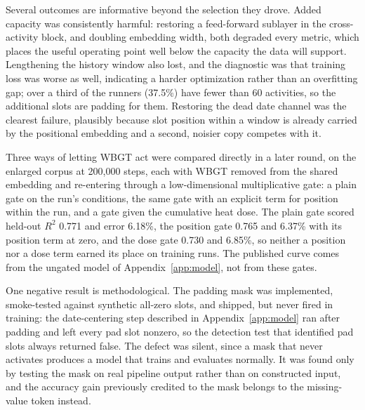 Several outcomes are informative beyond the selection they drove. Added capacity was consistently
harmful: restoring a feed-forward sublayer in the cross-activity block, and doubling embedding width,
both degraded every metric, which places the useful operating point well below the capacity the data
will support. Lengthening the history window also lost, and the diagnostic was that training loss was
worse as well, indicating a harder optimization rather than an overfitting gap; over a third of the
runners (37.5\%) have fewer than 60 activities, so the additional slots are padding for them. Restoring the
dead date channel was the clearest failure, plausibly because slot position within a window is
already carried by the positional embedding and a second, noisier copy competes with it.

Three ways of letting WBGT act were compared directly in a later round, on the enlarged corpus at 200{,}000 steps,
each with WBGT removed from the shared embedding and re-entering through a low-dimensional multiplicative gate: a plain
gate on the run's conditions, the same gate with an explicit term for position within the run, and a gate given the
cumulative heat dose. The plain gate scored held-out $R^2$ 0.771 and error 6.18\%, the position gate 0.765 and 6.37\%
with its position term at zero, and the dose gate 0.730 and 6.85\%, so neither a position nor a dose term earned its
place on training runs. The published curve comes from the ungated model of Appendix~\ref{app:model}, not from these
gates.

One negative result is methodological. The padding mask was implemented, smoke-tested against
synthetic all-zero slots, and shipped, but never fired in training: the date-centering step described
in Appendix~\ref{app:model} ran after padding and left every pad slot nonzero, so the detection test
that identified pad slots always returned false. The defect was silent, since a mask that never
activates produces a model that trains and evaluates normally. It was found only by testing the mask
on real pipeline output rather than on constructed input, and the accuracy gain previously credited
to the mask belongs to the missing-value token instead.
